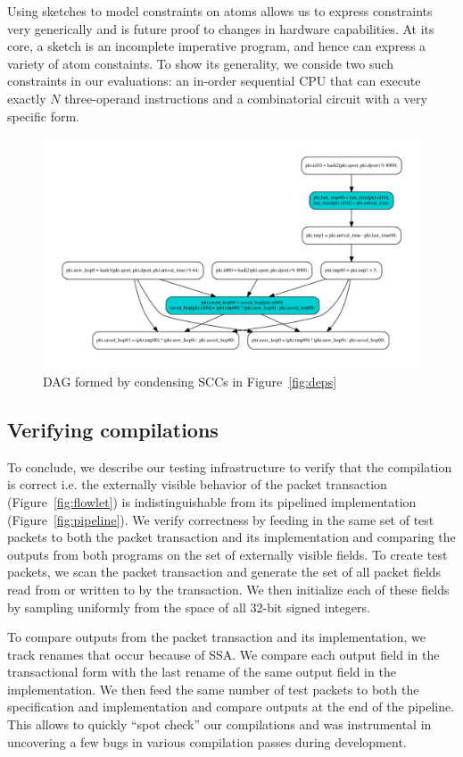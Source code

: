 Using sketches to model constraints on atoms allows us to express constraints
very generically and is future proof to changes in hardware capabilities. At
its core, a sketch is an incomplete imperative program, and hence can express a
variety of atom constaints. To show its generality, we conside two such
constraints in our evaluations: an in-order sequential CPU that can execute
exactly $N$ three-operand instructions and a combinatorial circuit with a very
specific form.

\begin{figure}
  \includegraphics[width=\columnwidth]{dag.pdf}
  \caption{DAG formed by condensing SCCs in Figure~\ref{fig:deps}}
  \label{fig:dag}
\end{figure}


\subsection{Verifying compilations}

To conclude, we describe our testing infrastructure to verify that the
compilation is correct i.e. the externally visible behavior of the packet
transaction (Figure~\ref{fig:flowlet}) is indistinguishable from its pipelined
implementation (Figure~\ref{fig:pipeline}). We verify correctness by feeding in
the same set of test packets to both the packet transaction and its
implementation and comparing the outputs from both programs on the set of
externally visible fields. To create test packets, we scan the packet
transaction and generate the set of all packet fields read from or written to
by the transaction. We then initialize each of these fields by sampling
uniformly from the space of all 32-bit signed integers.

To compare outputs from the packet transaction and its implementation, we track
renames that occur because of SSA. We compare each output field in the
transactional form with the last rename of the same output field in the
implementation. We then feed the same number of test packets to both the
specification and implementation and compare outputs at the end of the
pipeline. This allows to quickly ``spot check'' our compilations and was
instrumental in uncovering a few bugs in various compilation passes during
development.
